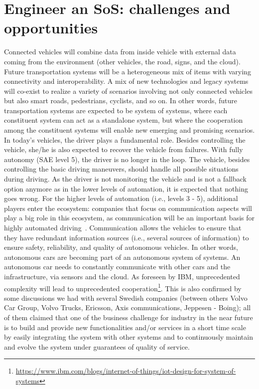 \section{Engineer an SoS: challenges and opportunities}\label{sec:engSoS}




Connected vehicles  will combine data from inside vehicle
with external data coming from the environment (other vehicles, the road, signs,
and the cloud).
Future transportation systems will be a heterogeneous mix of items with varying connectivity and interoperability. A mix of new technologies and legacy systems will co-exist to realize a variety of scenarios involving not only connected vehicles but also smart roads, pedestrians, cyclists, and so on. In other words, future transportation systems are expected to be system of systems, where each constituent system can act as a standalone system, but where the cooperation among the constituent systems will enable new emerging and promising scenarios.  
In today's vehicles, the driver plays a fundamental role. Besides controlling
the vehicle, she/he is also expected to recover the vehicle from failures. With fully
autonomy (SAE level 5), the driver is no longer in the loop. The vehicle, besides
controlling the basic driving maneuvers, should handle all possible situations during
driving. As the driver is not monitoring the vehicle and is not a fallback option
anymore as in the lower levels of automation, it is expected that nothing goes wrong.
For the higher levels of automation (i.e., levels 3 - 5), additional players enter the
ecosystem: companies that focus on communication aspects will play a big role in
this ecosystem, as communication will be an important basis for highly automated
driving~\cite{Knauss2017challenges}. Communication allows the vehicles to ensure that they have redundant
information sources (i.e., several sources of information) to ensure safety, reliability,
and quality of autonomous vehicles. In other words, autonomous cars are becoming part of an autonomous system of systems. An autonomous car needs to constantly communicate with other cars and the infrastructure, via sensors and the cloud. As foreseen by IBM, unprecedented complexity will lead to unprecedented cooperation\footnote{ \url{https://www.ibm.com/blogs/internet-of-things/iot-design-for-system-of-systems}}. This is also confirmed by some discussions we had with several Swedish companies (between others Volvo Car Group, Volvo Trucks, Ericsson,
Axis communications, Jeppesen - Boing); all of them claimed that one of the business challenge for industry
in the near future is to build and provide new functionalities and/or services in a short time scale by easily integrating
the system with other systems and to continuously maintain and evolve the system under guarantees of
quality of service.


